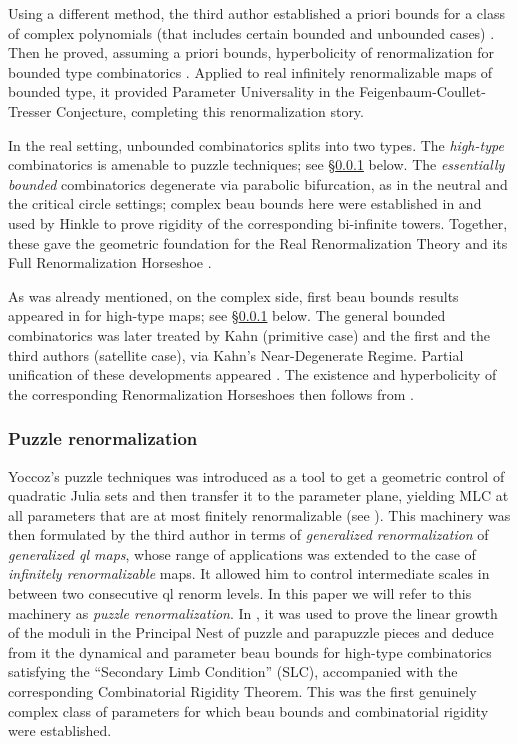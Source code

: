 \documentclass{amsart}
\begin{document}
Using a different method, the  third author established a priori bounds for a class of 
complex polynomials (that includes certain bounded and unbounded cases) \cite{LY97}.
Then he proved,  
assuming a priori bounds, hyperbolicity of renormalization 
for bounded type combinatorics \cite{L99}.
Applied to  real infinitely renormalizable maps of bounded type, 
it provided  Parameter Universality in the  Feigenbaum-Coullet-Tresser  Conjecture, 
completing this renormalization story.

In the real setting, unbounded combinatorics splits into two types.
The \emph{high-type} combinatorics is amenable to puzzle techniques; see \S\ref{sss:puzzle} below.
The \emph{essentially bounded} combinatorics degenerate via parabolic bifurcation, as in the neutral and the critical circle settings;
complex beau bounds here were established in \cite{LY97} and used by Hinkle \cite{Hin00} to prove rigidity of the corresponding bi-infinite towers.
Together, these gave the geometric foundation for the Real Renormalization Theory and its Full Renormalization Horseshoe \cite{L02}.

As was already mentioned, 
on the complex side,  first beau bounds  results appeared in \cite{Lyu97} for high-type maps; see \S\ref{sss:puzzle} below.
The general bounded combinatorics was later treated by Kahn \cite{K06} (primitive case) 
and the first and the third authors \cite{DLy26b} (satellite case), via Kahn's Near-Degenerate Regime.
Partial unification of these developments 
appeared \cite{KL08,KL09a}. 
The existence and hyperbolicity of the corresponding Renormalization Horseshoes then follows from \cite{L02,AL11}.

\subsubsection{Puzzle renormalization}
\label{sss:puzzle}
Yoccoz's puzzle techniques was introduced as a tool to get a geometric control of quadratic Julia sets
and then transfer it  to the parameter plane, 
yielding MLC at all parameters that are at most finitely renormalizable (see \cite{Hub93,Mil00}). 
This machinery was  then formulated by the third author in terms of {\em generalized renormalization} of
{\em generalized ql maps}, 
whose range of applications was  extended to the case of {\em infinitely renormalizable} maps.
It allowed him to control intermediate scales in between two consecutive ql renorm levels. 
In this paper we will refer to this machinery as {\em puzzle renormalization}.
In \cite{Lyu97,Lyu00}, it was used to prove the linear growth of the moduli in the Principal Nest of puzzle
and parapuzzle pieces
and deduce from it the  dynamical and parameter beau bounds for  high-type combinatorics
satisfying  the ``Secondary Limb Condition'' (SLC), accompanied with the corresponding Combinatorial Rigidity Theorem.  
This was the first  genuinely complex class 
of parameters for which  beau bounds and combinatorial rigidity were established. 
\end{document}
